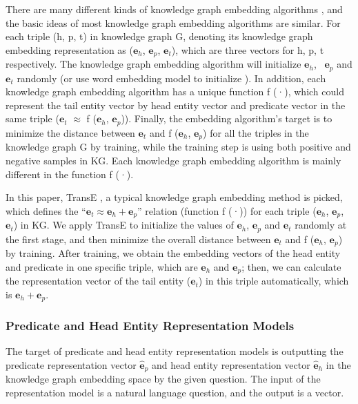 \documentclass[11pt]{article}
\begin{document}
There are many different kinds of knowledge graph embedding algorithms \cite{c9, c11}, and the basic ideas of most knowledge graph embedding algorithms \cite{c15, c22, c23} are similar. For each triple (h, p, t) in knowledge graph G, denoting its knowledge graph embedding representation as ($\mathbf{e}_h$, $\mathbf{e}_p$, $\mathbf{e}_t$), which are three vectors for h, p, t respectively. The knowledge graph embedding algorithm will initialize  $\mathbf{e}_h$, \ $\mathbf{e}_p$ and $\mathbf{e}_t$ randomly \cite{c15, c22} (or use word embedding model to initialize \cite{c24, c25}). In addition, each knowledge graph embedding algorithm has a unique function f (·), which could represent the tail entity vector by head entity vector and predicate vector in the same triple ($\mathbf{e}_t$ $\approx$ f ($\mathbf{e}_h$, $\mathbf{e}_p$)). Finally, the embedding algorithm's target is to minimize the distance between $\mathbf{e}_t$ and f ($\mathbf{e}_h$, $\mathbf{e}_p$) for all the triples in the knowledge graph G by training, while the training step is using both positive and negative samples in KG. Each knowledge graph embedding algorithm is mainly different in the function f (·).

In this paper, TransE \cite{c22}, a typical knowledge graph embedding method is picked, which defines the ``$\mathbf{e}_t \approx \mathbf{e}_h + \mathbf{e}_p$'' relation (function f (·)) for each triple ($\mathbf{e}_h$, $\mathbf{e}_p$, $\mathbf{e}_t$) in KG. We apply TransE to initialize the values of $\mathbf{e}_h$, $\mathbf{e}_p$ and $\mathbf{e}_t$ randomly at the first stage, and then minimize the overall distance between $\mathbf{e}_t$ and f ($\mathbf{e}_h$, $\mathbf{e}_p$) by training. After training, we obtain the embedding vectors of the head entity and predicate in one specific triple, which are $\mathbf{e}_h$ and $\mathbf{e}_p$; then, we can calculate the representation vector of the tail entity ($\mathbf{e}_t$) in this triple automatically, which is $\mathbf{e}_h + \mathbf{e}_p$.


\subsubsection{Predicate and Head Entity Representation Models}\label{sec:Predicate and Head Entity Representation Models}
The target of predicate and head entity representation models is outputting the predicate representation vector $\hat{\mathbf{e}}_p$ and head entity representation vector $\hat{\mathbf{e}}_h$ in the knowledge graph embedding space by the given question. The input of the representation model is a natural language question, and the output is a vector.
\end{document}
